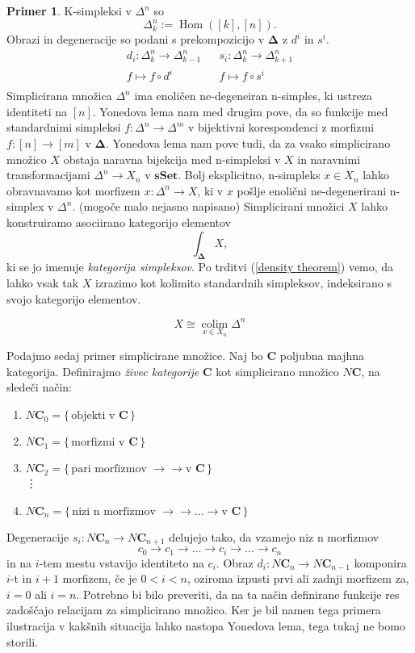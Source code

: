 \documentclass[12pt,a4paper]{book}
\theoremstyle{definition}
\theoremstyle{plain}
\theoremstyle{definition}
\newtheorem{primer}{Primer}[section]
\theoremstyle{remark}
\newcommand{\cat}[1]{\textbf{#1}}
\DeclareMathOperator{\Hom}{Hom}
\DeclareMathOperator{\colim}{colim}
\renewcommand{\set}[1]{\{\,#1\,\}}
\begin{document}
\begin{primer}
K-simpleksi v $\Delta^n$ so 
$$\Delta_k^n := \Hom([k], [n]).$$
Obrazi in degeneracije so podani s prekompozicijo v $\mathbf{\Delta}$ z $d^i$ in $s^i$.
\begin{align*}
d_i : \Delta_k^n \to \Delta_{k-1}^n & & s_i : \Delta_k^n \to \Delta_{k+1}^n \\
f \mapsto f \circ d^i & & f \mapsto f \circ s^i \\
\end{align*}
Simplicirana množica $\Delta^n$ ima enoličen ne-degeneiran n-simples, ki ustreza identiteti na $[n]$. Yonedova lema nam med drugim pove, da so funkcije med standardnimi simpleksi $f : \Delta^n \to \Delta^m$ v bijektivni korespondenci z morfizmi $f : [n] \to [m]$ v $\mathbf{\Delta}$. Yonedova lema nam pove tudi, da za vsako simplicirano množico $X$ obstaja naravna bijekcija med n-simpleksi v $X$ in naravnimi transformacijami $\Delta^n \to X_n$ v $\cat{sSet}$. Bolj eksplicitno, n-simpleks $x \in X_n$ lahko obravnavamo kot morfizem $x : \Delta^n \to X$, ki v $x$ pošlje enolični ne-degenerirani n-simplex v $\Delta^n$. (mogoče malo nejasno napisano)
Simplicirani množici $X$ lahko konstruiramo asociirano kategorijo elementov
$$\int_{\mathbf{\Delta}}X,$$
ki se jo imenuje \emph{kategorija simpleksov}. Po trditvi (\ref{density theorem}) vemo, da lahko vsak tak $X$ izrazimo kot kolimito standardnih simpleksov, indeksirano s svojo kategorijo elementov.

$$X \cong \underset{x \in X_n}{\colim}\Delta^n$$


Podajmo sedaj primer simplicirane množice. Naj bo $\cat{C}$ poljubna majhna kategorija. Definirajmo \emph{živec kategorije} $\cat{C}$ kot simplicirano množico $N\cat{C}$, na sledeči način:

\begin{enumerate}[label={}]
\item $N\cat{C}_0 = \set{\text{objekti v } \cat{C}}$
\item $N\cat{C}_1 = \set{\text{morfizmi v } \cat{C}}$
\item $N\cat{C}_2 = \set{\text{pari morfizmov } \rightarrow\rightarrow \text{v } \cat{C}}$ \\ %
\vdots
\item $N\cat{C}_n = \set{\text{nizi n morfizmov } \rightarrow\rightarrow\ldots\rightarrow \text{v } \cat{C}}$
\end{enumerate}
Degeneracije $s_i:N\cat{C}_n \to N\cat{C}_{n+1}$ delujejo tako, da vzamejo niz n morfizmov
$$ c_0 \rightarrow c_1 \rightarrow \ldots \rightarrow c_i \rightarrow \ldots \rightarrow c_n$$
in na $i$-tem mestu vstavijo identiteto na $c_i$. Obraz $d_i : N\cat{C}_n \to N\cat{C}_{n-1}$ komponira $i$-t in $i+1$ morfizem, če je $0 < i < n$, oziroma izpusti prvi ali zadnji morfizem za, $i = 0$ ali $i = n$.
Potrebno bi bilo preveriti, da na ta način definirane funkcije res zadoščajo relacijam za simplicirano množico. Ker je bil namen tega primera ilustracija v kakšnih situacija lahko nastopa Yonedova lema, tega tukaj ne bomo storili.
\end{primer}
\end{document}
